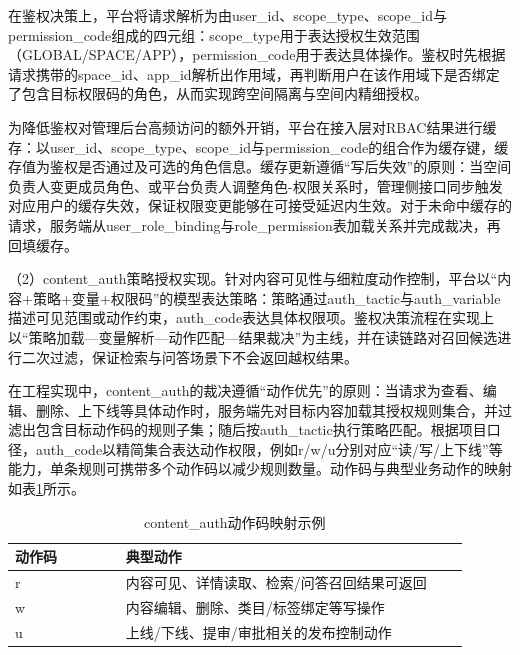 在鉴权决策上，平台将请求解析为由user\_\allowbreak id、scope\_\allowbreak type、scope\_\allowbreak id与permission\_\allowbreak code组成的四元组：scope\_\allowbreak type用于表达授权生效范围（GLOBAL/SPACE/APP），permission\_\allowbreak code用于表达具体操作。鉴权时先根据请求携带的space\_\allowbreak id、app\_\allowbreak id解析出作用域，再判断用户在该作用域下是否绑定了包含目标权限码的角色，从而实现跨空间隔离与空间内精细授权。

为降低鉴权对管理后台高频访问的额外开销，平台在接入层对RBAC结果进行缓存：以user\_\allowbreak id、scope\_\allowbreak type、scope\_\allowbreak id与permission\_\allowbreak code的组合作为缓存键，缓存值为鉴权是否通过及可选的角色信息。缓存更新遵循“写后失效”的原则：当空间负责人变更成员角色、或平台负责人调整角色-权限关系时，管理侧接口同步触发对应用户的缓存失效，保证权限变更能够在可接受延迟内生效。对于未命中缓存的请求，服务端从user\_\allowbreak role\_\allowbreak binding与role\_\allowbreak permission表加载关系并完成裁决，再回填缓存。

（2）content\_auth策略授权实现。针对内容可见性与细粒度动作控制，平台以“内容+策略+变量+权限码”的模型表达策略：策略通过auth\_tactic与auth\_variable描述可见范围或动作约束，auth\_code表达具体权限项。鉴权决策流程在实现上以“策略加载—变量解析—动作匹配—结果裁决”为主线，并在读链路对召回候选进行二次过滤，保证检索与问答场景下不会返回越权结果。

在工程实现中，content\_auth的裁决遵循“动作优先”的原则：当请求为查看、编辑、删除、上下线等具体动作时，服务端先对目标内容加载其授权规则集合，并过滤出包含目标动作码的规则子集；随后按auth\_tactic执行策略匹配。根据项目口径，auth\_code以精简集合表达动作权限，例如r/w/u分别对应“读/写/上下线”等能力，单条规则可携带多个动作码以减少规则数量。动作码与典型业务动作的映射如表\ref{tab:cm_auth_code_map}所示。

\begin{table}[!htbp]
  \centering
  \caption{content\_auth动作码映射示例}
  \label{tab:cm_auth_code_map}
  \small
  \begin{tabular}{>{\raggedright\arraybackslash}p{0.22\linewidth}|>{\raggedright\arraybackslash}p{0.68\linewidth}}
    \hline
    动作码 & 典型动作 \\ \hline
    r & 内容可见、详情读取、检索/问答召回结果可返回 \\ \hline
    w & 内容编辑、删除、类目/标签绑定等写操作 \\ \hline
    u & 上线/下线、提审/审批相关的发布控制动作 \\ \hline
  \end{tabular}
\end{table}

